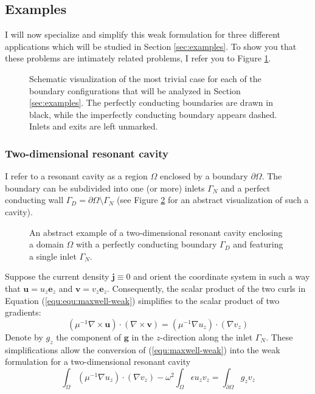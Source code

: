 \documentclass[11pt, a4paper]{article}
\begin{document}
\subsection{Examples}
\label{subsec:examples}

I will now specialize and simplify this weak formulation for three different
applications which will be studied in Section \ref{sec:examples}. To show you
that these problems are intimately related problems, I refer you to Figure \ref{fig:examples}.

\begin{figure}[h]
    \centering
    
    \caption{Schematic visualization of the most trivial case for each of the
    boundary configurations that will be analyzed in Section \ref{sec:examples}.
    The perfectly conducting boundaries are drawn in black, while the imperfectly
    conducting boundary appears dashed. Inlets and exits are left unmarked.}
    \label{fig:examples}
\end{figure}

\subsubsection{Two-dimensional resonant cavity}
\label{subsubsec:cavity}

I refer to a resonant cavity as a region $\Omega$ enclosed by a boundary $\partial \Omega$.
The boundary can be subdivided into one (or more) inlets $\Gamma_N$ and a perfect
conducting wall $\Gamma_D = \partial \Omega \setminus \Gamma_N$
(see Figure \ref{fig:2d-cavity} for an abstract visualization of such a cavity).

\begin{figure}[h]
    \centering
    
    \caption{An abstract example of a two-dimensional resonant cavity enclosing
    a domain $\Omega$ with a perfectly conducting boundary $\Gamma_D$ and
    featuring a single inlet $\Gamma_N$.}
    \label{fig:2d-cavity}
\end{figure}

Suppose the current density $\mathbf{j} \equiv 0$ and orient the coordinate
system in such a way that $\mathbf{u} = u_z \mathbf{e}_z$ and 
$\mathbf{v} = v_z \mathbf{e}_z$. Consequently, the scalar product of the two 
curls in Equation (\ref{equ:equ:maxwell-weak}) simplifies to the scalar product 
of two gradients:
\begin{equation}
    (\mu^{-1} \nabla \times \mathbf{u}) \cdot (\nabla \times \mathbf{v})
    = (\mu^{-1} \nabla u_z) \cdot (\nabla v_z)
\end{equation}
Denote by $g_z$ the component of $\mathbf{g}$ in the $z$-direction along the
inlet $\Gamma_N$. These simplifications allow the conversion of 
(\ref{equ:maxwell-weak}) into the weak formulation for a two-dimensional
resonant cavity
\begin{equation}
    \int_{\Omega} (\mu^{-1} \nabla u_z) \cdot (\nabla v_z)
    - \omega^2 \int_{\Omega} \epsilon u_z v_z
    = \int_{\partial \Omega} g_z v_z \label{equ:maxwell-weak-resonant-cavity}
\end{equation}
\end{document}
